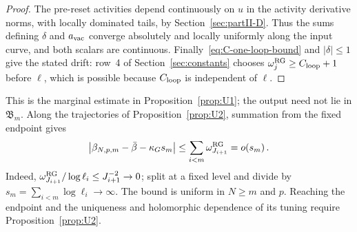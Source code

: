 \begin{proof}
The pre-reset activities depend continuously on $u$ in the activity derivative norms, with locally dominated tails, by Section~\ref{sec:partII-D}. Thus the sums defining $\delta$ and $a_{\rm vac}$ converge absolutely and locally uniformly along the input curve, and both scalars are continuous. Finally~\eqref{eq:C-one-loop-bound} and $|\delta|\le1$ give the stated drift: row~4 of Section~\ref{sec:constants} chooses $\omega_j^{\rm RG}\ge C_{\rm loop}+1$ before $\ell$, which is possible because $C_{\rm loop}$ is independent of $\ell$.
\end{proof}

This is the marginal estimate in Proposition~\ref{prop:U1}; the output need not lie in $\mathfrak B_m$. Along the trajectories of Proposition~\ref{prop:U2}, summation from the fixed endpoint gives
\begin{equation}\label{eq:C-running-sum}
 \left|\beta_{N,p,m}-\bar\beta-\kappa_G s_m\right|
 \le\sum_{i<m}\omega_{J_{i+1}}^{\rm RG}=o(s_m)\,.
\end{equation}
Indeed, $\omega_{J_{i+1}}^{\rm RG}/\log\ell_i\le J_{i+1}^{-2}\to0$; split at a fixed level and divide by $s_m=\sum_{i<m}\log\ell_i\to\infty$. The bound is uniform in $N\ge m$ and $p$. Reaching the endpoint and the uniqueness and holomorphic dependence of its tuning require Proposition~\ref{prop:U2}.
